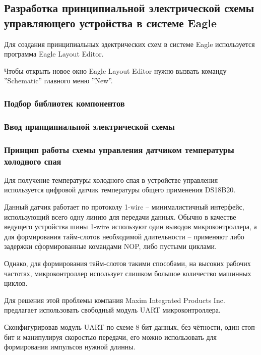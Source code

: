 \subsection{Разработка принципиальной электрической схемы управляющего устройства в системе Eagle}
Для создания принципиальных эдектрических схем в системе Eagle используется программа
Eagle Layout Editor.

Чтобы открыть новое окно Eagle Layout Editor нужно вызвать команду ''Schematic''
главного меню ''New''.

\subsubsection{Подбор библиотек компонентов}

\subsubsection{Ввод принципиальной электрической схемы}

\subsubsection{Принцип работы схемы управления датчиком температуры холодного спая}
Для получение температуры холодного спая в устройстве управления используется цифровой датчик
температуры общего применения DS18B20.

Данный датчик работает по протоколу 1-wire -- минималистичный интерфейс, использующий
всего одну линию для передачи данных. Обычно в качестве ведущего устройства
шины 1-wire используют один выводов микроконтроллера, а для формирования
тайм-слотов необходимой длительности -- применяют либо задержки сформированные
командами NOP, либо пустыми циклами.


Однако, для формирования тайм-слотов такими способами, на высоких рабочих
частотах, микроконтроллер использует слишком большое количество машинных циклов.


Для решения этой проблемы компания Maxim Integrated Products Inc.
предлагает использовать \cite{max2usart} свободный модуль UART микроконтроллера.


Сконфигурировав модуль UART по схеме 8 бит данных, без чётности, один стоп-бит и
манипулируя скоростью передачи, его можно использовать для формирования
импульсов нужной длинны.


